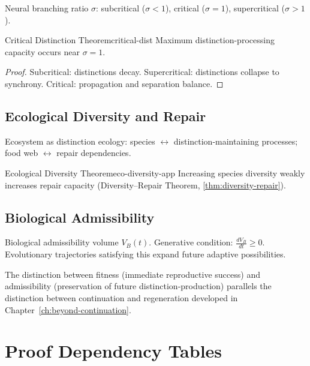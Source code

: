\documentclass[12pt,twoside,openright]{book}
\begin{document}
Neural branching ratio $\sigma$:
subcritical ($\sigma<1$), critical ($\sigma=1$),
supercritical ($\sigma>1$).

\begin{theorem}{Critical Distinction Theorem}{critical-dist}
  Maximum distinction-processing capacity occurs
  near $\sigma = 1$.
\end{theorem}

\begin{proof}
  Subcritical: distinctions decay.
  Supercritical: distinctions collapse to synchrony.
  Critical: propagation and separation balance.
\end{proof}

\section{Ecological Diversity and Repair}

Ecosystem as distinction ecology:
species $\leftrightarrow$ distinction-maintaining processes;
food web $\leftrightarrow$ repair dependencies.

\begin{theorem}{Ecological Diversity Theorem}{eco-diversity-app}
  Increasing species diversity weakly increases repair
  capacity (Diversity--Repair Theorem,
  \cref{thm:diversity-repair}).
\end{theorem}

\section{Biological Admissibility}

Biological admissibility volume $V_B(t)$.
Generative condition: $\frac{dV_B}{dt} \ge 0$.
Evolutionary trajectories satisfying this expand future
adaptive possibilities.

The distinction between fitness (immediate reproductive
success) and admissibility (preservation of future
distinction-production) parallels the distinction between
continuation and regeneration developed in
Chapter~\ref{ch:beyond-continuation}.

\chapter{Proof Dependency Tables}
\label{app:deps}
\end{document}
